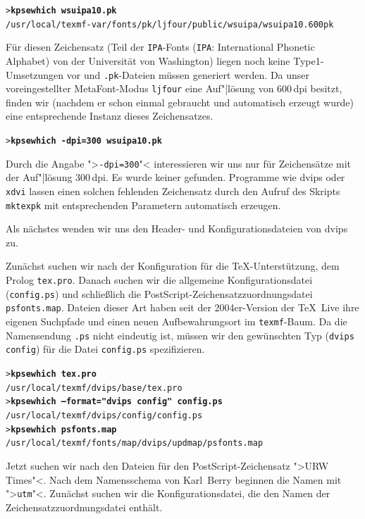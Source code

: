 \documentclass[12pt,ngerman,a4paper,fullparskip]{scrreprt}
\newcommand{\TL}{\TeX\ Live\xspace}
\newcommand{\acro}[1]{\texttt{#1}}
\newcommand{\cmdname}[1]{\texttt{#1}}
\newcommand{\code}[1]{\texttt{#1}}
\newcommand{\OnCD}[1]{\texttt{#1}}
\newcommand{\file}[1]{\texttt{#1}}
\newcommand{\Ucom}[1]{\textbf{\texttt{#1}}}
\def\MF{MetaFont}
\providecommand*{\PS}{Post\-Script\xspace}
\begin{document}
\begin{alltt}
> \Ucom{kpsewhich wsuipa10.pk}
 /usr/local/texmf-var/fonts/pk/ljfour/public/wsuipa/wsuipa10.600pk
\end{alltt}
Für diesen Zeichensatz (Teil der \acro{IPA}-Fonts (\acro{IPA}: International Phonetic Alphabet)
von der Universität von Washington) liegen noch keine
Type1-Umsetzungen vor und \code{.pk}-Dateien müssen generiert werden. Da unser voreingestellter \MF-Modus \code{ljfour} eine Auf"|lösung von 600\,dpi besitzt,
finden wir (nachdem er schon einmal gebraucht und automatisch
erzeugt wurde) eine entsprechende Instanz dieses Zeichensatzes.

\begin{alltt}
> \Ucom{kpsewhich -dpi=300 wsuipa10.pk}
\end{alltt}

Durch die Angabe ">\code{-dpi=300}"< interessieren wir uns nur
für Zeichensätze mit der Auf"|lösung 300\,dpi. Es wurde keiner gefunden.
Programme wie dvips oder \cmdname{xdvi} lassen einen solchen fehlenden
Zeichensatz durch den Aufruf des Skripts \cmdname{mktexpk} mit entsprechenden
Parametern automatisch erzeugen.

Als nächstes wenden wir uns den Header- und Konfigurationsdateien
von dvips zu.

Zunächst suchen wir nach der Konfiguration für die \TeX-Unterstützung,
dem Prolog \file{tex.pro}. Danach suchen wir die allgemeine Konfigurationsdatei
(\file{config.ps}) und schließlich die \PS-Zeichensatzzuordnungsdatei
\file{psfonts.map}. Dateien dieser Art haben seit der 2004er-Version der {\TL} ihre eigenen Suchpfade und einen neuen Aufbewahrungsort im \OnCD{texmf}-Baum. Da die Namens\-endung \code{.ps} nicht eindeutig ist,
müssen wir den gewünschten Typ (\code{dvips config})
für die Datei \file{config.ps} spezifizieren.

\begin{alltt}
> \Ucom{kpsewhich tex.pro}
   /usr/local/texmf/dvips/base/tex.pro
> \Ucom{kpsewhich --format="dvips config" config.ps}
   /usr/local/texmf/dvips/config/config.ps
> \Ucom{kpsewhich psfonts.map}
   /usr/local/texmf/fonts/map/dvips/updmap/psfonts.map
\end{alltt}

Jetzt suchen wir nach den Dateien für den \PS-Zeichensatz ">URW Times"<.
Nach dem Namensschema von Karl~Berry beginnen die Namen mit ">\texttt{utm}"<.
Zunächst suchen wir die Konfigurationsdatei, die den Namen der
Zeichensatzzuordnungsdatei enthält.
\end{document}
